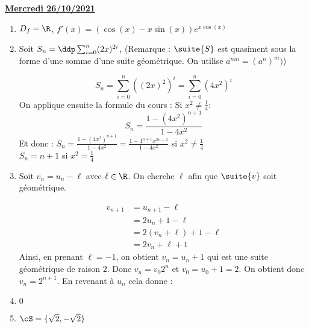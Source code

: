 \documentclass[a4paper, 11pt,reqno]{article}
\newcommand{\jour}[1]{
\begin{center}
\underline{\textbf{#1}}
\end{center}

 }
\begin{document}
\jour{Mercredi 26/10/2021}
\begin{correction}
\begin{enumerate}
\item $D_f= \R$, $f'(x) =(\cos(x) -x\sin(x) ) e^{x\cos(x)}$
\item 
Soit $S_n=\ddp \sum_{i=0}^n (2x)^{2i}$, (Remarque : $\suite{S}$ est quasiment sous la forme d'une somme d'une suite géométrique. On utilise $a^{nm} = (a^{n})^m)$) 

$$S_n = \sum_{i=0}^n ((2x)^2)^i= \sum_{i=0}^n (4x^2)^i$$
On applique ensuite la formule du cours : 
Si $x^2\neq \frac{1}{4}$:
$$S_n =\frac{1-(4x^2)^{n+1}}{1-4x^2}$$
Et donc :
$S_n= \frac{1-(4x^2)^{n+1}}{1-4x^2} = \frac{1-4^{n+1}x^{2n+2}}{1-4x^2}$ si $x^2\neq \frac{1}{4}$\\
$S_n=n+1$ si $x^2=\frac{1}{4}$

\item 
Soit $v_n =u_n-\ell$ avec $\ell \in \R$. On cherche $\ell$ afin que $\suite{v}$ soit géométrique. 

\begin{align*}
v_{n+1}&=u_{n+1}-\ell\\
			&= 2u_n+1-\ell\\
			&=2(v_n+\ell) +1-\ell\\
			&=2v_n+ \ell +1
\end{align*}
Ainsi, en prenant $\ell =-1$, on obtient $v_n = u_n+1$ qui est une suite géométrique de raison $2$. 
Donc $v_n =v_0 2^n $ et $v_0 = u_0+1=2$. On obtient donc $v_n =2^{n+1}$. En revenant à $u_n$ cela donne  : 



\item $0$
\item $\cS=\{ \sqrt{2}, -\sqrt{2}\}$
\end{enumerate}
\end{correction} 
\end{document}
